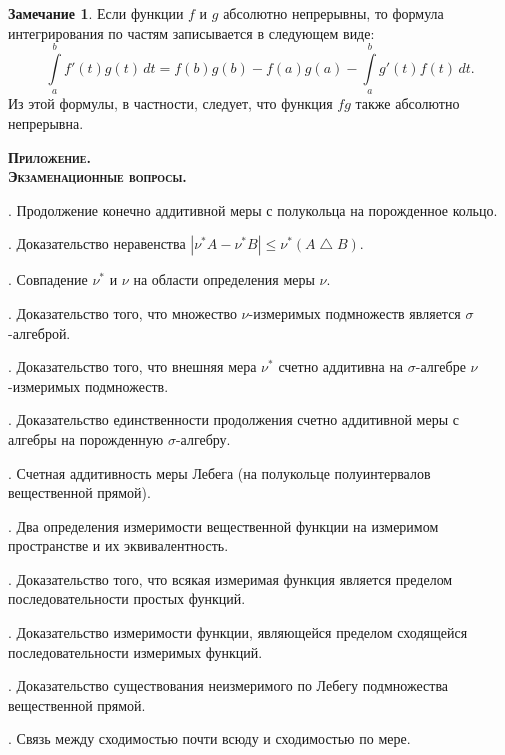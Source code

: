 \documentclass[12pt,titlepage]{article}
\theoremstyle{definition}
\newtheorem*{zam}{Замечание}
\begin{document}
\begin{zam}
Если функции $f$ и $g$ абсолютно непрерывны, то формула
интегрирования по частям записывается в следующем виде:
$$\int\limits_a^b\!f'(t)g(t)\,dt=f(b)g(b)-f(a)g(a)-\int\limits_a^b\!g'(t)f(t)\,dt.$$
Из этой формулы, в частности, следует, что функция $fg$ также
абсолютно непрерывна.
\end{zam}

\clearpage

\begin{center}
\textbf{\textsc{Приложение. \\ Экзаменационные вопросы.}}
\end{center}

\vspace{7pt}

. Продолжение конечно аддитивной меры с полукольца на
порожденное кольцо.

. Доказательство неравенства $|\nu^*A-\nu^*B|\leqslant
\nu^*(A\bigtriangleup B)$.

. Совпадение $\nu^*$ и $\nu$ на области определения меры
$\nu$.

. Доказательство того, что множество $\nu$-измеримых
подмножеств является $\sigma$-алгеброй.

. Доказательство того, что внешняя мера $\nu^*$ счетно
аддитивна на $\sigma$-алгебре $\nu$-измеримых подмножеств.

. Доказательство единственности продолжения счетно
аддитивной меры с алгебры на порожденную $\sigma$-алгебру.

. Счетная аддитивность меры Лебега (на полукольце
полуинтервалов вещественной прямой).

. Два определения измеримости вещественной функции на
измеримом пространстве и их эквивалентность.

. Доказательство того, что всякая измеримая функция
является пределом последовательности простых функций.

. Доказательство измеримости функции, являющейся
пределом сходящейся последовательности измеримых функций.

. Доказательство существования неизмеримого по Лебегу
подмножества вещественной прямой.

. Связь между сходимостью почти всюду и сходимостью по
мере.
\end{document}
